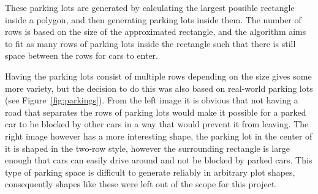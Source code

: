 These parking lots are generated by calculating the largest possible rectangle inside a polygon, and then generating parking lots inside them.
The number of rows is based on the size of the approximated rectangle, and the algorithm aims to fit as many rows of parking lots inside the rectangle such that there is still space between the rows for cars to enter.

Having the parking lots consist of multiple rows depending on the size gives some more variety, but the decision to do this was also based on real-world parking lots (see Figure~\ref{fig:parkings}).
From the left image it is obvious that not having a road that separates the rows of parking lots would make it possible for a parked car to be blocked by other cars in a way that would prevent it from leaving.
The right image however has a more interesting shape, the parking lot in the center of it is shaped in the two-row style, however the surrounding rectangle is large enough that cars can easily drive around and not be blocked by parked cars.
This type of parking space is difficult to generate reliably in arbitrary plot shapes, consequently shapes like these were left out of the scope for this project.
